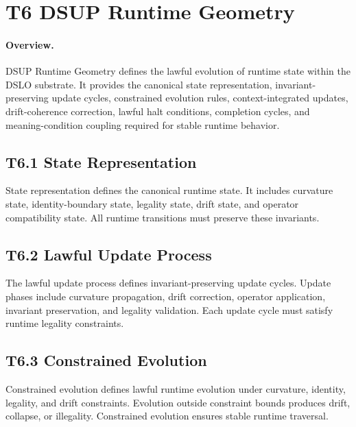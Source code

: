 
\section{T6 DSUP Runtime Geometry}

\paragraph{Overview.}
DSUP Runtime Geometry defines the lawful evolution of runtime state within the
DSLO substrate. It provides the canonical state representation, invariant-
preserving update cycles, constrained evolution rules, context-integrated
updates, drift-coherence correction, lawful halt conditions, completion cycles,
and meaning-condition coupling required for stable runtime behavior.

\subsection{T6.1 State Representation}
State representation defines the canonical runtime state. It includes curvature
state, identity-boundary state, legality state, drift state, and operator
compatibility state. All runtime transitions must preserve these invariants.

\subsection{T6.2 Lawful Update Process}
The lawful update process defines invariant-preserving update cycles. Update
phases include curvature propagation, drift correction, operator application,
invariant preservation, and legality validation. Each update cycle must satisfy
runtime legality constraints.

\subsection{T6.3 Constrained Evolution}
Constrained evolution defines lawful runtime evolution under curvature,
identity, legality, and drift constraints. Evolution outside constraint bounds
produces drift, collapse, or illegality. Constrained evolution ensures stable
runtime traversal.


